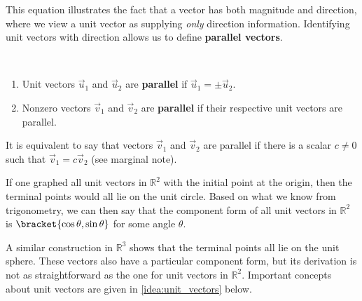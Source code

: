 This equation illustrates the fact that a vector has both magnitude and direction, where we view a unit vector as supplying \textit{only} direction information. Identifying unit vectors with direction allows us to define \textbf{parallel vectors}.

{\mbox{}\\[-2\baselineskip]\begin{enumerate}
	\item Unit vectors $\vec u_1$ and $\vec u_2$ are \textbf{parallel} if $\vec u_1 = \pm \vec u_2$.
	\item	Nonzero vectors $\vec v_1$ and $\vec v_2$ are \textbf{parallel} if their respective unit vectors are parallel.
\end{enumerate}}

It is equivalent to say that vectors $\vec v_1$ and $\vec v_2$ are parallel if there is a scalar $c\neq 0$ such that $\vec v_1 = c\vec v_2$ (see marginal note).

If one graphed all unit vectors in $\mathbb{R}^2$ with the initial point at the origin, then the terminal points would all lie on the unit circle. Based on what we know from trigonometry, we can then say that the component form of all unit vectors in $\mathbb{R}^2$ is $\bracket{\cos\theta,\sin\theta}$ for some angle $\theta$.

A similar construction in $\mathbb{R}^3$ shows that the terminal points all lie on the unit sphere. These vectors also have a particular component form, but its derivation is not as straightforward as the one for unit vectors in $\mathbb{R}^2$. Important concepts about unit vectors are given in \autoref{idea:unit_vectors} below.

